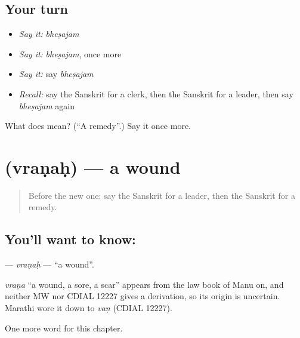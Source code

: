 \subsection*{Your turn}
\begin{itemize}
\raggedright
  \item \emph{Say it:} \emph{bheṣajam}
  \item \emph{Say it:} \emph{bheṣajam}, once more
  \item \emph{Say it:} say \emph{bheṣajam}
  \item \emph{Recall:} say the Sanskrit for a clerk, then the Sanskrit for a leader, then say \emph{bheṣajam} again
\end{itemize}

\begin{tcolorbox}[breakable,colback=teal!4,colframe=teal!35!black,title={Before you move on}]
What does  mean? (\textquotedblleft{}A remedy\textquotedblright{}.) Say it once more.
\end{tcolorbox}
\section[\texorpdfstring{\sk{व्रणः} (vraṇaḥ)}{व्रणः (vraṇaḥ)}]{ (vraṇaḥ) — a wound}

\label{lesson:SA-C150-vranah}



\begin{quote}
Before the new one: say the Sanskrit for a leader, then the Sanskrit for a remedy.
\end{quote}

\subsection*{You'll want to know: }
\textbf{} — \emph{vraṇaḥ} — \textquotedblleft{}a wound\textquotedblright{}.

\begin{cousinweb}
\emph{vraṇa} \textquotedblleft{}a wound, a sore, a scar\textquotedblright{} appears from the law book of Manu on, and neither MW nor CDIAL 12227 gives a derivation, so its origin is uncertain. Marathi wore it down to \emph{vaṇ} (CDIAL 12227).
\end{cousinweb}

\begin{grammarlens}[title={What you've built}]
One more word for this chapter.
\end{grammarlens}

